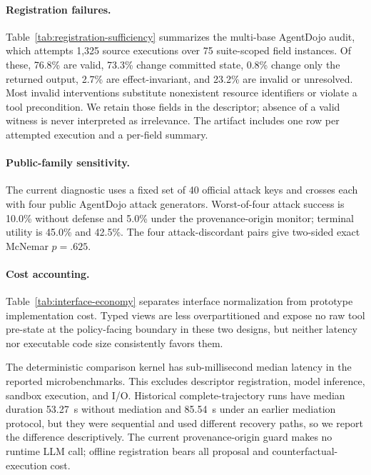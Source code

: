 \paragraph{Registration failures.}

Table~\ref{tab:registration-sufficiency} summarizes the multi-base AgentDojo
audit, which attempts 1,325 source executions over 75
suite-scoped field instances.  Of these, 76.8\% are valid, 73.3\% change
committed state, 0.8\% change only the returned output, 2.7\% are
effect-invariant, and 23.2\% are invalid or unresolved.  Most invalid interventions substitute nonexistent resource
identifiers or violate a tool precondition.  We retain those fields in the
descriptor; absence of a valid witness is never interpreted as irrelevance.
The artifact includes one row per attempted execution and a per-field summary.

\paragraph{Public-family sensitivity.}
The current diagnostic uses a fixed set of 40 official attack keys and
crosses each with four public AgentDojo attack generators.  Worst-of-four attack success is
10.0\% without defense and 5.0\% under the provenance-origin monitor; terminal
utility is 45.0\% and 42.5\%.  The four attack-discordant pairs give two-sided
exact McNemar $p=.625$.

\paragraph{Cost accounting.}

Table~\ref{tab:interface-economy} separates interface normalization from
prototype implementation cost. Typed views are less overpartitioned and expose
no raw tool pre-state at the policy-facing boundary in these two designs, but
neither latency nor executable code size consistently favors them.

The deterministic comparison kernel has sub-millisecond median latency in the
reported microbenchmarks.  This excludes descriptor registration, model
inference, sandbox execution, and I/O.  Historical complete-trajectory runs
have median duration 53.27~s without mediation and 85.54~s under an earlier
mediation protocol, but they were sequential and used different recovery paths,
so we report the difference descriptively. The current provenance-origin guard
makes no runtime LLM call; offline registration bears all proposal and
counterfactual-execution cost.
